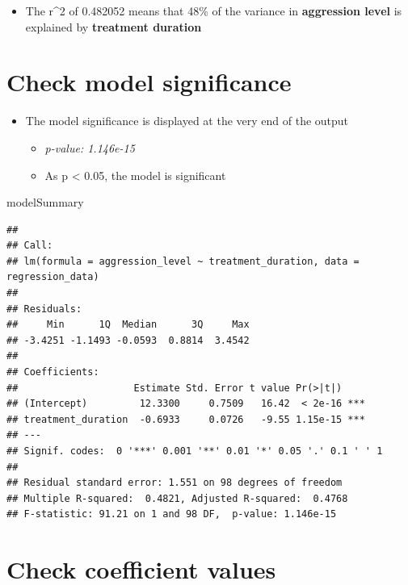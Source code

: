 \documentclass[
]{book}
\newenvironment{Shaded}{\begin{snugshade}}{\end{snugshade}}
\newcommand{\NormalTok}[1]{#1}
\providecommand{\tightlist}{%
  \setlength{\itemsep}{0pt}\setlength{\parskip}{0pt}}
\begin{document}
\begin{itemize}
\tightlist
\item
  The r\^{}2 of 0.482052 means that 48\% of the variance in \textbf{aggression level} is explained by \textbf{treatment duration}
\end{itemize}

\hypertarget{check-model-significance}{%
\section{Check model significance}\label{check-model-significance}}

\begin{itemize}
\tightlist
\item
  The model significance is displayed at the very end of the output

  \begin{itemize}
  \tightlist
  \item
    \emph{p-value: 1.146e-15}
  \item
    As p \textless{} 0.05, the model is significant
  \end{itemize}
\end{itemize}

\begin{Shaded}
\begin{Highlighting}[]
\NormalTok{modelSummary}
\end{Highlighting}
\end{Shaded}

\begin{verbatim}
## 
## Call:
## lm(formula = aggression_level ~ treatment_duration, data = regression_data)
## 
## Residuals:
##     Min      1Q  Median      3Q     Max 
## -3.4251 -1.1493 -0.0593  0.8814  3.4542 
## 
## Coefficients:
##                    Estimate Std. Error t value Pr(>|t|)    
## (Intercept)         12.3300     0.7509   16.42  < 2e-16 ***
## treatment_duration  -0.6933     0.0726   -9.55 1.15e-15 ***
## ---
## Signif. codes:  0 '***' 0.001 '**' 0.01 '*' 0.05 '.' 0.1 ' ' 1
## 
## Residual standard error: 1.551 on 98 degrees of freedom
## Multiple R-squared:  0.4821, Adjusted R-squared:  0.4768 
## F-statistic: 91.21 on 1 and 98 DF,  p-value: 1.146e-15
\end{verbatim}

\hypertarget{check-coefficient-values}{%
\section{Check coefficient values}\label{check-coefficient-values}}
\end{document}
